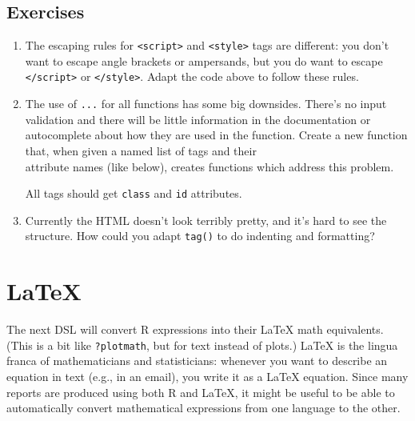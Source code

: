 \hypertarget{exercises}{%
\subsection{Exercises}\label{exercises}}

\begin{enumerate}
\def\labelenumi{\arabic{enumi}.}
\item
  The escaping rules for \texttt{\textless{}script\textgreater{}} and
  \texttt{\textless{}style\textgreater{}} tags are different: you don't
  want to escape angle brackets or ampersands, but you do want to escape
  \texttt{\textless{}/script\textgreater{}} or
  \texttt{\textless{}/style\textgreater{}}. Adapt the code above to
  follow these rules.
\item
  The use of \texttt{...} for all functions has some big downsides.
  There's no input validation and there will be little information in
  the documentation or autocomplete about how they are used in the
  function. Create a new function that, when given a named list of tags
  and their\\
  attribute names (like below), creates functions which address this
  problem.

\begin{Shaded}
\begin{Highlighting}[]
\NormalTok{(}
   \NormalTok{(}\NormalTok{),}
   \NormalTok{(}\NormalTok{, }\NormalTok{, }\NormalTok{)}
\NormalTok{)}
\end{Highlighting}
\end{Shaded}

  All tags should get \texttt{class} and \texttt{id} attributes.
\item
  Currently the HTML doesn't look terribly pretty, and it's hard to see
  the structure. How could you adapt \texttt{tag()} to do indenting and
  formatting?
\end{enumerate}

\hypertarget{latex}{%
\section{LaTeX}\label{latex}}

The next DSL will convert R expressions into their LaTeX math
equivalents. (This is a bit like \texttt{?plotmath}, but for text
instead of plots.) LaTeX is the lingua franca of mathematicians and
statisticians: whenever you want to describe an equation in text (e.g.,
in an email), you write it as a LaTeX equation. Since many reports are
produced using both R and LaTeX, it might be useful to be able to
automatically convert mathematical expressions from one language to the
other. 

